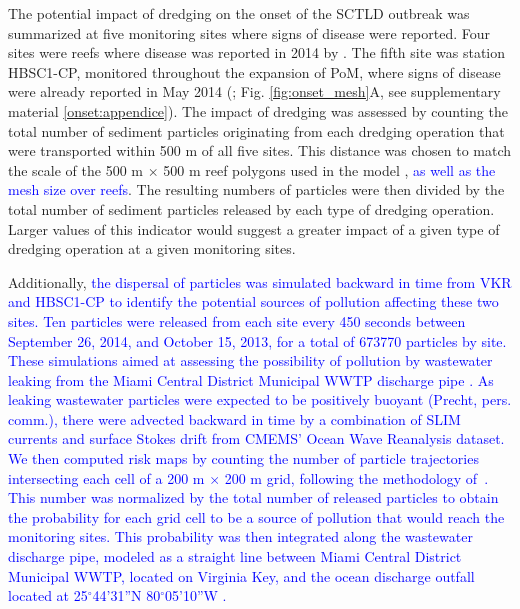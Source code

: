 \documentclass[preprint,12pt,authoryear]{elsarticle}
\newcommand{\modif}[1]{\textcolor{blue}{#1}}
\begin{document}
The potential impact of dredging on the onset of the SCTLD outbreak was summarized at five monitoring sites where signs of disease were reported. Four sites were reefs where disease was reported in 2014 by \cite{precht2016unprecedented}. The fifth site was station HBSC1-CP, monitored throughout the expansion of PoM, where signs of disease were already reported in May 2014 (\citealp{dial2017}; Fig. \ref{fig:onset_mesh}A, see supplementary material \ref{onset:appendice}). The impact of dredging was assessed by counting the total number of sediment particles originating from each dredging operation that were transported within 500 m of all five sites. This distance was chosen to match the scale of the 500 m $\times$ 500 m reef polygons used in the model \citep{dobbelaere2020coupled}, \modif{as well as the mesh size over reefs}. The resulting numbers of particles were then divided by the total number of sediment particles released by each type of dredging operation. Larger values of this indicator would suggest a greater impact of a given type of dredging operation at a given monitoring sites.  

Additionally, \modif{the dispersal of particles was simulated backward in time from VKR and HBSC1-CP to identify the potential sources of pollution affecting these two sites. Ten particles were released from each site every 450 seconds between September 26, 2014, and October 15, 2013, for a total of 673770 particles by site. These simulations aimed at assessing the possibility of pollution by wastewater leaking from the Miami Central District Municipal WWTP discharge pipe \citep{gintert2019regional}. As leaking wastewater particles were expected to be positively buoyant (Precht, pers. comm.), there were advected backward in time by a combination of SLIM currents and surface Stokes drift from CMEMS' Ocean Wave Reanalysis dataset. We then computed risk maps by counting the number of particle trajectories intersecting each cell of a 200 m $\times$ 200 m grid, following the methodology of~\cite{anselain2023qatar}. This number was normalized by the total number of released particles to obtain the probability for each grid cell to be a source of pollution that would reach the monitoring sites.}
\modif{This probability was then integrated along the wastewater discharge pipe, modeled as a straight line between Miami Central District Municipal WWTP, located on Virginia Key, and the ocean discharge outfall located at 25$^\circ$44'31''N 80$^\circ$05'10''W \citep{koopman2006ocean}.}
\end{document}
